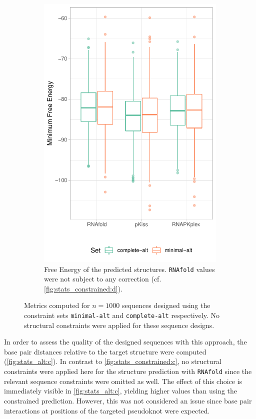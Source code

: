 \documentclass[../../master.tex]{subfiles}
\begin{document}
\begin{figure}[!ht]
\begin{subfigure}[t]{0.27\textwidth}
		\includegraphics[width=\textwidth]{pic/results/designs/boxplots/alt-mfe-boxplot.pdf}
		\caption{Free Energy of the predicted structures.  \texttt{RNAfold} values were not subject to any correction (cf. \autoref{fig:stats_constrained:d}).
		}\label{fig:stats_alt:d}
	\end{subfigure}
	\caption[Properties of Sequence Designs (Alternative Approach)]{
		Metrics computed for $n = 1000$ sequences designed using the constraint sets \texttt{minimal-alt} and \texttt{complete-alt} respectively.
		No structural constraints were applied for these sequence designs.
	}\label{fig:stats_alt}
\end{figure}

In order to assess the quality of the designed sequences with this approach, the base pair distances relative to the target structure were computed (\autoref{fig:stats_alt:c}).
In contrast to \autoref{fig:stats_constrained:c}, no structural constraints were applied here for the structure prediction with \texttt{RNAfold} since the relevant sequence constraints were omitted as well.
The effect of this choice is immediately visible in \ref{fig:stats_alt:c}, yielding higher values than using the constrained prediction.
However, this was not considered an issue since base pair interactions at positions of the targeted pseudoknot were expected.
\end{document}
